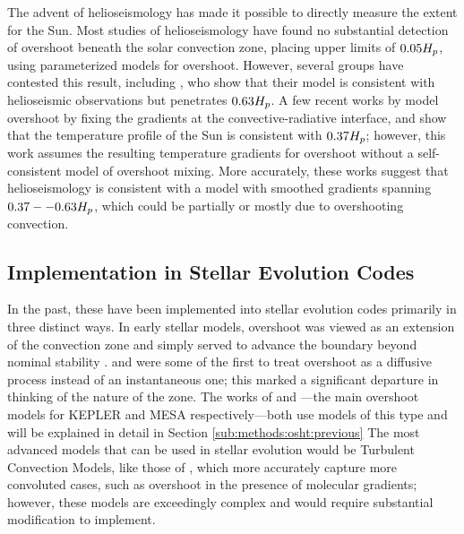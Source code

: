 	The advent of helioseismology has made it possible to directly measure the extent for the Sun.
		Most studies of helioseismology \citep[e.g.]{Basu1997} have found no substantial detection of overshoot beneath the solar convection zone, placing upper limits of $0.05 H_{p}$, using parameterized models for overshoot.
		However, several groups have contested this result, including \citet{Xiong2001}, who show that their model \citep[implemented in][]{Xiong1986} is consistent with helioseismic observations but penetrates $0.63 H_{p}$. %
		A few recent works by \citet{Baturin2010,Christensen-Dalsgaard2011} model overshoot by fixing the gradients at the convective-radiative interface, and \citet{Christensen-Dalsgaard2011} show that the temperature profile of the Sun is consistent with $0.37 H_{p}$; however, this work assumes the resulting temperature gradients for overshoot without a self-consistent model of overshoot mixing.
		More accurately, these works suggest that helioseismology is consistent with a model with smoothed gradients spanning $0.37--0.63 H_{p}$, which could be partially or mostly due to overshooting convection.


\subsection{Implementation in Stellar Evolution Codes} %
\label{sub:intro:osht:implementation}

		In the past, these have been implemented into stellar evolution codes primarily in three distinct ways.
			In early stellar models, overshoot was viewed as an extension of the convection zone and simply served to advance the boundary beyond nominal stability \citep[e.g. see the work by Doctor Doom:][]{Bressan1981,Doom1986}.
			\citet{Deng1996} and \citet{Freytag1996} were some of the first to treat overshoot as a diffusive process instead of an instantaneous one; this marked a significant departure in thinking of the nature of the zone.
				The works of \citet{Woosley1988} and \citet{Herwig2000}---the main overshoot models for KEPLER and MESA respectively---both use models of this type and will be explained in detail in Section \ref{sub:methods:osht:previous}
			The most advanced models that can be used in stellar evolution would be Turbulent Convection Models, like those of \citet{Xiong1986,Canuto2011}, which more accurately capture more convoluted cases, such as overshoot in the presence of molecular gradients; however, these models are exceedingly complex and would require substantial modification to implement.

